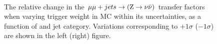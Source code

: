 \begin{figure}[!h]
  \centering
   ~~
  \\

  \caption{\label{fig:tfSyst_trigger_mumuToZinv} The relative change in
  the $\mu\mu + jets \rightarrow ({\text Z} \rightarrow \nu\bar{\nu})$ transfer
  factors when varying trigger weight in MC within its uncertainties, as a function of \scalht and jet category. 
  Variations corresponding to $+1\sigma$ ($-1\sigma$) are shown in the left (right) figure. 
  }
\end{figure}

